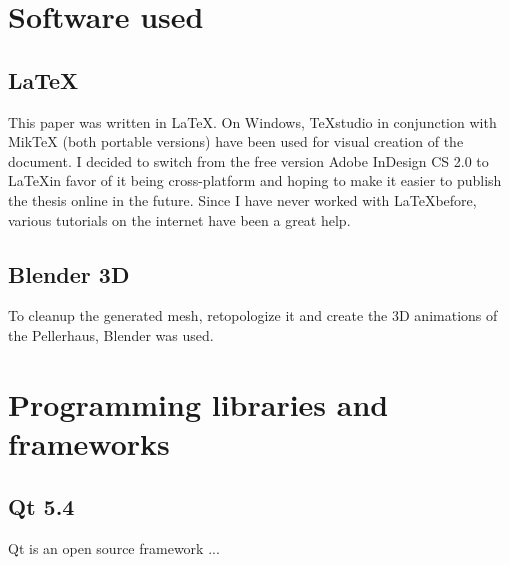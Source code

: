 \section{Software used}

\subsection{\LaTeX}
This paper was written in \LaTeX. On Windows, TeXstudio in conjunction with MikTeX (both portable versions) have been used for visual creation of the document. I decided to switch from the free version Adobe InDesign CS 2.0 to \LaTeX in favor of it being cross-platform and hoping to make it easier to publish the thesis online in the future. Since I have never worked with \LaTeX before, various tutorials \parencite{ytLaTeX,webLaTeX-Tutorial} on the internet have been a great help.

\subsection{Blender 3D}
To cleanup the generated mesh, retopologize it and create the 3D animations of the Pellerhaus, Blender was used.


\section{Programming libraries and frameworks}

\subsection{Qt 5.4}

Qt is an open source framework ...